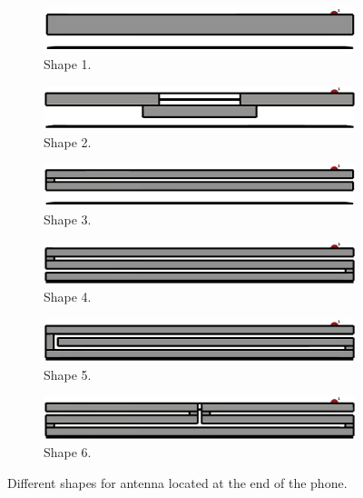 \begin{figure}[H]
    \centering
    \begin{subfigure}[b]{0.3\textwidth}
        \includegraphics[width=\textwidth]{img/shape1.eps}
        \caption{Shape 1.}
        \label{fig:shape1}
    \end{subfigure}
    \begin{subfigure}[b]{0.3\textwidth}
        \includegraphics[width=\textwidth]{img/shape2.eps}
        \caption{Shape 2.}
        \label{fig:shape2}
    \end{subfigure}
    \begin{subfigure}[b]{0.3\textwidth}
        \includegraphics[width=\textwidth]{img/shape3.eps}
        \caption{Shape 3.}
        \label{fig:shape3}
    \end{subfigure}
    
    \begin{subfigure}[b]{0.3\textwidth}
        \includegraphics[width=\textwidth]{img/shape4.eps}
        \caption{Shape 4.}
        \label{fig:shape4}
    \end{subfigure}
    \begin{subfigure}[b]{0.3\textwidth}
        \includegraphics[width=\textwidth]{img/shape5.eps}
        \caption{Shape 5.}
        \label{fig:shape5}
    \end{subfigure}
    \begin{subfigure}[b]{0.3\textwidth}
        \includegraphics[width=\textwidth]{img/shape6.eps}
        \caption{Shape 6.}
        \label{fig:shape6}
    \end{subfigure}
    \caption{Different shapes for antenna located at the end of the phone.}
    \label{fig:shape_models}
\end{figure}

